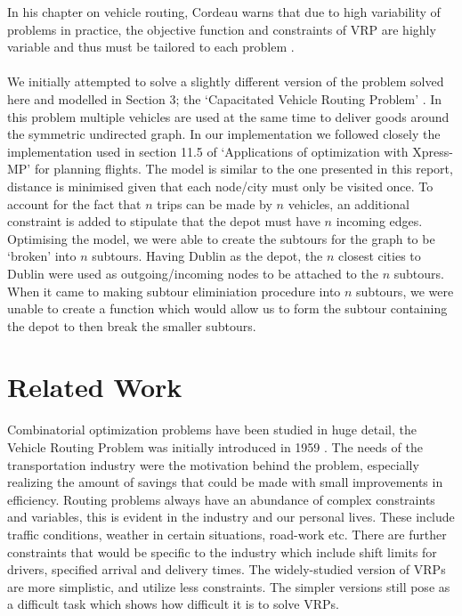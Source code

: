 \documentclass[a4paper,11pt]{article}
\begin{document}
In his chapter on vehicle routing, Cordeau warns that due to high variability of problems in practice, the objective function and constraints of VRP are highly variable and thus must be tailored to each problem \cite{cordeau2007vehicle}.
\\\\
We initially attempted to solve a slightly different version of the problem solved here and modelled in Section 3; the `Capacitated Vehicle Routing Problem' \cite{toth2002models}. In this problem multiple vehicles are used at the same time to deliver goods around the symmetric undirected graph. In our implementation we followed closely the implementation used in section 11.5 of  `Applications of optimization with Xpress-MP'  \cite{gueret1999applications} for planning flights. The model is similar to the one presented in this report, distance is minimised given that each node/city must only be visited once. To account for the fact that $n$ trips can be made by $n$ vehicles, an additional constraint is added to stipulate that the depot must have $n$ incoming edges. Optimising the model, we were able to create the subtours for the graph to be `broken' into $n$ subtours. Having Dublin as the depot, the $n$ closest cities to Dublin were used as outgoing/incoming nodes to be attached to the $n$ subtours. When it came to making subtour eliminiation procedure into $n$ subtours, we were unable to create a function which would allow us to form the subtour containing the depot to then break the smaller subtours.



\section{Related Work}
Combinatorial optimization problems have been studied in huge detail, the Vehicle Routing Problem was initially introduced in 1959 \cite{dantzig1959truck}. The needs of the transportation industry were the motivation behind the problem, especially realizing the amount of savings that could be made with small improvements in efficiency. Routing problems always have an abundance of complex constraints and variables, this is evident in the industry and our personal lives. These include traffic conditions, weather in certain situations, road-work etc. There are further constraints that would be specific to the industry which include shift limits for drivers, specified arrival and delivery times. The widely-studied version of VRPs are more simplistic, and utilize less constraints. The simpler versions still pose as a difficult task which shows how difficult it is to solve VRPs. 
\end{document}

